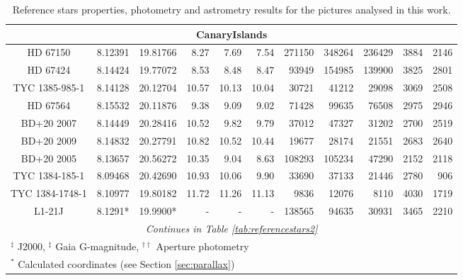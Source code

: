 \begin{table*}
{\begin{tabular}{c|cc|rrr|rrr|rr}
\hline
\multicolumn{11}{c}{CanaryIslands}\\
\hline
HD 67150 & 8.12391 & 19.81766 & 8.27 & 7.69 & 7.54 & 271150 & 348264 & 236429 & 3884 & 2146\\
HD 67424 & 8.14424 & 19.77072 & 8.53 & 8.48 & 8.47 & 93949 & 154985 & 139900 & 3825 & 2801\\
TYC 1385-985-1 & 8.14128 & 20.12704 & 10.57 & 10.13 & 10.04 & 30721 & 41212 & 29098 & 3069 & 2508\\
HD 67564 & 8.15532 & 20.11876 & 9.38 & 9.09 & 9.02 & 71428 & 99635 & 76508 & 2975 & 2946\\
BD+20 2007 & 8.14449 & 20.28416 & 10.52 & 9.82 & 9.79 & 37012 & 47327 & 31202 & 2700 & 2519\\
BD+20 2009 & 8.14832 & 20.27791 & 10.82 & 10.52 & 10.44 & 19677 & 28174 & 21551 & 2683 & 2640\\
BD+20 2005 & 8.13657 & 20.56272 & 10.35 & 9.04 & 8.63 & 108293 & 105234 & 47290 & 2152 & 2118\\
TYC 1384-185-1 & 8.09468 & 20.42690 & 10.93 & 10.06 & 9.90 & 33690 & 37133 & 21446 & 2780 & 906\\
TYC 1384-1748-1 & 8.10977 & 19.80182 & 11.72 & 11.26 & 11.13 & 9836 & 12076 & 8110 & 4030 & 1719\\
L1-21J & 8.1291* & 19.9900* & - & - & - & 138565 & 94635 & 30931 & 3465 & 2210\\

\hline
\multicolumn{11}{c}{\it Continues in Table \ref{tab:referencestars2}}\\
\hline\hline
\multicolumn{11}{l}{\footnotesize $^\ddagger$ J2000, $^\ddagger$ Gaia G-magnitude, $^{\dagger\dagger}$ Aperture photometry}\\
\multicolumn{11}{l}{\footnotesize $^*$ Calculated coordinates (see Section \ref{sec:parallax})}\\
\end{tabular}}
\caption{Reference stars properties, photometry and astrometry results for the pictures analysed in this work.\label{tab:referencestars1}}
\end{table*}
